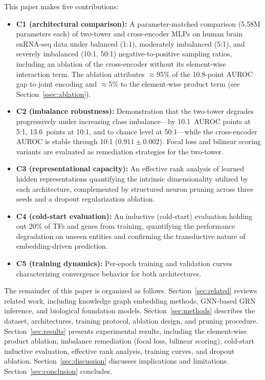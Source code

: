 \documentclass[journal]{IEEEtran}
\begin{document}
This paper makes five contributions:
\begin{itemize}
\item \textbf{C1 (architectural comparison):} A parameter-matched comparison (5.58M parameters each)
  of two-tower and cross-encoder MLPs on human brain snRNA-seq data under
  balanced (1:1), moderately imbalanced (5:1), and severely imbalanced (10:1,
  50:1) negative-to-positive sampling ratios, including an ablation of the
  cross-encoder without its
  element-wise interaction term. The ablation attributes $\approx$95\% of the
  10.8-point AUROC gap to joint encoding and $\approx$5\% to the element-wise
  product term (see Section~\ref{ssec:ablation}).
\item \textbf{C2 (imbalance robustness):} Demonstration that the two-tower degrades
  progressively under increasing class imbalance---by 10.1~AUROC points at 5:1,
  13.6~points at 10:1, and to chance level at 50:1---while the cross-encoder
  AUROC is stable through 10:1 ($0.911 \pm 0.002$). Focal loss and bilinear
  scoring variants are evaluated as remediation strategies for the two-tower.
\item \textbf{C3 (representational capacity):} An effective rank analysis of learned
  hidden representations quantifying the intrinsic dimensionality utilized by
  each architecture, complemented by structured neuron pruning across three
  seeds and a dropout regularization ablation.
\item \textbf{C4 (cold-start evaluation):} An inductive (cold-start) evaluation
  holding out 20\% of TFs and genes from training, quantifying the
  performance degradation on unseen entities and confirming the transductive
  nature of embedding-driven prediction.
\item \textbf{C5 (training dynamics):} Per-epoch training and validation curves
  characterizing convergence behavior for both architectures.
\end{itemize}

The remainder of this paper is organized as follows.
Section~\ref{sec:related} reviews related work, including knowledge graph
embedding methods, GNN-based GRN inference, and biological foundation models.
Section~\ref{sec:methods} describes the dataset, architectures, training
protocol, ablation design, and pruning procedure.
Section~\ref{sec:results} presents experimental results, including the
element-wise product ablation, imbalance remediation (focal loss, bilinear
scoring), cold-start inductive evaluation, effective rank analysis,
training curves, and dropout ablation.
Section~\ref{sec:discussion} discusses implications and limitations.
Section~\ref{sec:conclusion} concludes.
\end{document}

